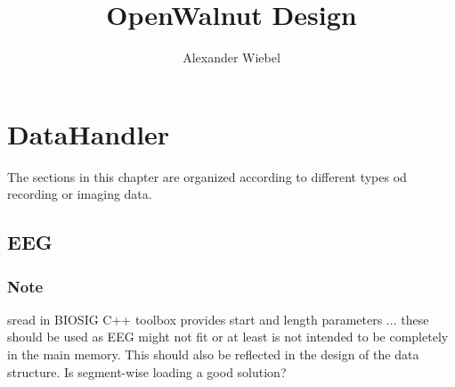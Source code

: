 \documentclass[a4paper,12pt]{scrbook}
\begin{document}
\titlehead{
  OpenWalnut Project\\
  www.openwalnut.org}

\subject{Documentation}
\title{
  OpenWalnut Design
}
\author{ Alexander Wiebel }
\publishers{Leipzig}
\maketitle

\tableofcontents

\chapter{DataHandler}
The sections in this chapter are organized according to different
types od recording or imaging data.
\section{EEG}
\subsection{Note}
 sread in BIOSIG C++ toolbox provides start and length parameters ... these should be used as EEG might not fit or at least is not intended to be completely in the main memory. This should also be reflected in the design of the data structure.
 Is segment-wise loading a good solution?
\end{document}
